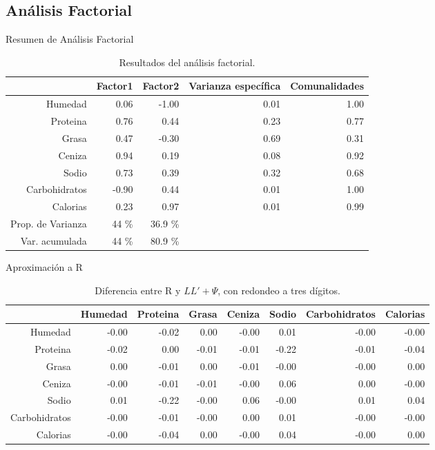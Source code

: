 \documentclass[pdf]{beamer}
\begin{document}
\subsection{Análisis Factorial}

\begin{frame}{Resumen de Análisis Factorial}
\begin{table}[ht]
\begin{adjustbox}{width= 4in,center}
\centering
\begin{tabular}{rrrrr}
  \hline
 & Factor1 & Factor2 & Varianza específica & Comunalidades \\ 
  \hline
Humedad & 0.06 & -1.00 & 0.01 & 1.00 \\ 
  Proteina & 0.76 & 0.44 & 0.23 & 0.77 \\ 
  Grasa & 0.47 & -0.30 & 0.69 & 0.31 \\ 
  Ceniza & 0.94 & 0.19 & 0.08 & 0.92 \\ 
  Sodio & 0.73 & 0.39 & 0.32 & 0.68 \\ 
  Carbohidratos & -0.90 & 0.44 & 0.01 & 1.00 \\ 
  Calorias & 0.23 & 0.97 & 0.01 & 0.99 \\     
  Prop. de Varianza  & 44 \% &  36.9 \% \\
  Var. acumulada & 44 \% &  80.9 \% \\ 
   \hline
\end{tabular}
\end{adjustbox}
	\label{tabla:factores}
	\caption{Resultados del análisis factorial.}	
\end{table}
\end{frame}

\begin{frame}{Aproximación a R}
\begin{table}[ht]
\begin{adjustbox}{width= 4in,center}
\centering
\begin{tabular}{rrrrrrrr}
  \hline
 & Humedad & Proteina & Grasa & Ceniza & Sodio & Carbohidratos & Calorias \\ 
  \hline
Humedad & -0.00 & -0.02 & 0.00 & -0.00 & 0.01 & -0.00 & -0.00 \\ 
  Proteina & -0.02 & 0.00 & -0.01 & -0.01 & -0.22 & -0.01 & -0.04 \\ 
  Grasa & 0.00 & -0.01 & 0.00 & -0.01 & -0.00 & -0.00 & 0.00 \\ 
  Ceniza & -0.00 & -0.01 & -0.01 & -0.00 & 0.06 & 0.00 & -0.00 \\ 
  Sodio & 0.01 & -0.22 & -0.00 & 0.06 & -0.00 & 0.01 & 0.04 \\ 
  Carbohidratos & -0.00 & -0.01 & -0.00 & 0.00 & 0.01 & -0.00 & -0.00 \\ 
  Calorias & -0.00 & -0.04 & 0.00 & -0.00 & 0.04 & -0.00 & 0.00 \\ 
   \hline
\end{tabular}
\end{adjustbox}
	\label{tabla:aproximacion}
	\caption{Diferencia entre R y $LL' + \Psi$, con redondeo a tres dígitos.}
\end{table}
\end{frame}
\end{document}
